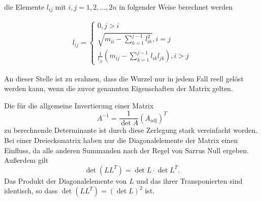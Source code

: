die Elemente $l_{ij}$ mit $i,j=1,2,\dots,2n$ in folgender Weise berechnet werden

\begin{equation}
\begin{aligned}
	l_{ij}=
	\begin{cases}
	0, j>i\\
	\sqrt{m_{ii}-\sum \limits_{k=1}^{j-1}l^{2}_{ik}} , i=j\\
	\frac{1}{l_{jj}} \left( m_{ij}-\sum \limits_{k=1}^{j-1}l_{ik}l_{jk}\right) , i>j
	\end{cases}
\end{aligned}
\end{equation}

An dieser Stelle ist zu erahnen, dass die Wurzel nur in jedem Fall reell gelöst werden kann, wenn die zuvor genannten Eigenschaften der Matrix gelten.

Die für die allgemeine Invertierung einer Matrix  $$ A^{-1} = \dfrac{1}{\det A}(A_{\mathrm{adj}})^{T}$$zu berechnende Determinante ist durch diese Zerlegung stark vereinfacht worden. Bei einer Dreiecksmatrix haben nur die Diagonalelemente der Matrix einen Einfluss, da alle anderen Summanden nach der Regel von Sarrus Null ergeben. Außerdem gilt $$\det({L} {L}^T)=\det{L}\cdot\det{L}^T.$$ Das Produkt der Diagonalelemente von ${L}$ und das ihrer Transponierten sind identisch, so dass $\det({L} {L}^T)=(\det{L})^2$ ist.

